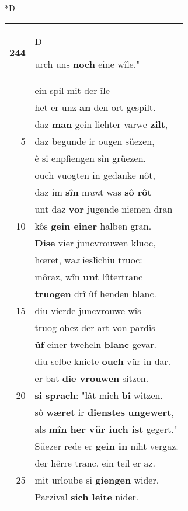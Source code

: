 \documentclass[8pt,a4paper,notitlepage]{article}
\begin{document}
\begin{table}[ht]
\begin{minipage}[t]{0.5\linewidth}
\small
\begin{center}*D
\end{center}
\begin{tabular}{rl}
\textbf{244} & \begin{large}D\end{large}urch uns \textbf{noch} eine wîle."\\ 
 & ein spil mit der île\\ 
 & het er unz \textbf{an} den ort gespilt.\\ 
 & daz \textbf{man} gein liehter varwe \textbf{zilt},\\ 
5 & daz begunde ir ougen süezen,\\ 
 & ê si enpfiengen sîn grüezen.\\ 
 & ouch vuogten in gedanke nôt,\\ 
 & daz im \textbf{sîn} m\textit{un}t was \textbf{sô rôt}\\ 
 & unt daz \textbf{vor} jugende niemen dran\\ 
10 & kôs \textbf{gein einer} halben gran.\\ 
 & \textbf{Dise} vier juncvrouwen kluoc,\\ 
 & hœret, wa\textit{z} ieslîchiu truoc:\\ 
 & môraz, wîn \textbf{unt} lûtertranc\\ 
 & \textbf{truogen} drî ûf henden blanc.\\ 
15 & diu vierde juncvrouwe wîs\\ 
 & truog obez der art von pardîs\\ 
 & \textbf{ûf} einer tweheln \textbf{blanc} gevar.\\ 
 & diu selbe kniete \textbf{ouch} vür in dar.\\ 
 & er bat \textbf{die vrouwen} sitzen.\\ 
20 & \textbf{si sprach}: "lât mich \textbf{bî} witzen.\\ 
 & sô \textbf{wæret} ir \textbf{dienstes} \textbf{ungewert},\\ 
 & als \textbf{mîn her vür iuch ist} gegert."\\ 
 & Süezer rede er \textbf{gein in} niht vergaz.\\ 
 & der hêrre tranc, ein teil er az.\\ 
25 & mit urloube si \textbf{giengen} wider.\\ 
 & Parzival \textbf{sich leite} nider.\\ 

\end{tabular}
\end{minipage}
\end{table}
\end{document}
